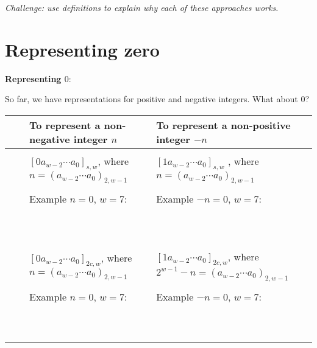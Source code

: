 \documentclass[12pt, oneside]{article}
\begin{document}
{\it Challenge: use definitions to explain why
each of these approaches works.} \vfill
\section*{Representing zero}


{\bf Representing $0$}:

So far, we have representations for
positive and negative integers. What about $0$?

\begin{tabular}{|cc|p{3.4in}|p{3.7in}|}
   \hline
   & & To  represent a {\bf non-negative} integer $n$ & To represent a {\bf non-positive} integer $-n$\\
   \hline
   && &  \\
   &\parbox[t]{2mm}{} &
   $[ 0a_{w-2} \cdots a_0]_{s,w}$, where $n =  (a_{w-2} \cdots a_0)_{2,w-1}$& 
   $[1a_{w-2} \cdots a_0]_{s,w}$
   , where $n =  (a_{w-2} \cdots a_0)_{2,w-1}$\\
   && & \\
   && Example $n=0$, $w=7$:  & Example $-n=0$, $w=7$: \\
   && & \\
   && & \\
   && & \\
   && & \\
   && & \\
   && & \\
   && & \\
   && & \\
   && & \\
   && & \\
\hline
   &&  &  \\
   &\parbox[t]{2mm}{} &
   $[0a_{w-2} \cdots a_0]_{2c,w}$, where $n =  (a_{w-2} \cdots a_0)_{2,w-1}$& $[1a_{w-2} \cdots a_0]_{2c,w}$, where $2^{w-1} - n =  (a_{w-2} \cdots a_0)_{2,w-1}$\\
   && & \\
   && Example $n=0$, $w=7$:  & Example $-n=0$, $w=7$: \\
   && & \\
   && & \\
   && & \\
   && & \\
   && & \\
   && & \\
   && & \\
   && & \\
   && & \\
   && & \\
\hline
\end{tabular} \vfill
\end{document}
